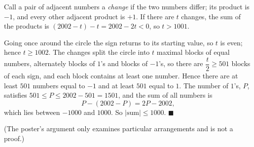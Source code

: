 Call a pair of adjacent numbers a \emph{change} if the two numbers differ; its product is $-1$, and every other adjacent product is $+1$. If there are $t$ changes, the sum of the products is $(2002-t)-t=2002-2t<0$, so $t>1001$.

Going once around the circle the sign returns to its starting value, so $t$ is even; hence $t\ge1002$. The changes split the circle into $t$ maximal blocks of equal numbers, alternately blocks of $1$'s and blocks of $-1$'s, so there are $\dfrac {t}{2}\ge501$ blocks of each sign, and each block contains at least one number. Hence there are at least $501$ numbers equal to $-1$ and at least $501$ equal to $1$. The number of $1$'s, $P$, satisfies $501\le P\le2002-501=1501$, and the sum of all numbers is
\[
P-(2002-P)=2P-2002,
\]
which lies between $-1000$ and $1000$. So $\boxed{|\text{sum}|\le1000}$. $\blacksquare$

(The poster's argument only examines particular arrangements and is not a proof.)
